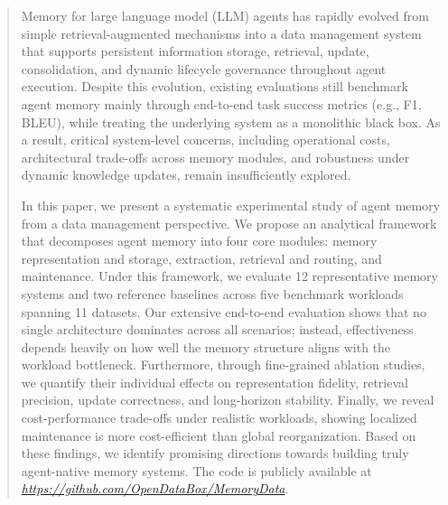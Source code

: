 \documentclass[sigconf]{acmart}
\newcommand{\blue}[1]{\textcolor{blue}{#1}}
\begin{document}
\begin{abstract}
Memory for large language model (LLM) agents has rapidly evolved from simple retrieval-augmented mechanisms into a data management system that supports persistent information storage, retrieval, update, consolidation, and dynamic lifecycle governance throughout agent execution. Despite this evolution, existing evaluations still benchmark agent memory mainly through end-to-end task success metrics (e.g., F1, BLEU), while treating the underlying system as a monolithic black box. As a result, critical system-level concerns, including operational costs, architectural trade-offs across memory modules, and robustness under dynamic knowledge updates, remain insufficiently explored.


In this paper, we present a systematic experimental study of agent memory from a data management perspective. We propose an analytical framework that decomposes agent memory into four core modules: memory representation and storage, extraction, retrieval and routing, and maintenance. Under this framework, we evaluate 12 representative memory systems and two reference baselines across five benchmark workloads spanning 11 datasets. Our extensive end-to-end evaluation shows that no single architecture dominates across all scenarios; instead, effectiveness depends heavily on how well the memory structure aligns with the workload bottleneck. Furthermore, through fine-grained ablation studies, we quantify their individual effects on representation fidelity, retrieval precision, update correctness, and long-horizon stability. Finally, we reveal cost-performance trade-offs under realistic workloads, showing localized maintenance is more cost-efficient than global reorganization. Based on these findings, we identify promising directions towards building truly agent-native memory systems.
The code is publicly available at \blue{\emph{\url{https://github.com/OpenDataBox/MemoryData}}}.



\end{abstract}
\end{document}
